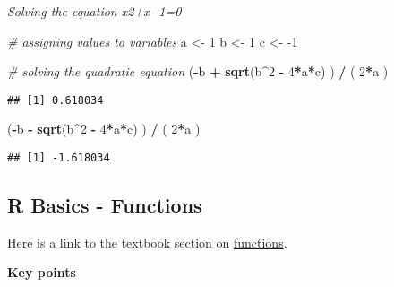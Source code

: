 \documentclass[]{article}
\newenvironment{Shaded}{\begin{snugshade}}{\end{snugshade}}
\newcommand{\CommentTok}[1]{\textcolor[rgb]{0.56,0.35,0.01}{\textit{#1}}}
\newcommand{\DecValTok}[1]{\textcolor[rgb]{0.00,0.00,0.81}{#1}}
\newcommand{\KeywordTok}[1]{\textcolor[rgb]{0.13,0.29,0.53}{\textbf{#1}}}
\newcommand{\NormalTok}[1]{#1}
\newcommand{\OperatorTok}[1]{\textcolor[rgb]{0.81,0.36,0.00}{\textbf{#1}}}
\newcommand{\StringTok}[1]{\textcolor[rgb]{0.31,0.60,0.02}{#1}}
\begin{document}
\emph{Solving the equation x2+x−1=0}

\begin{Shaded}
\begin{Highlighting}[]
\CommentTok{# assigning values to variables}
\NormalTok{a <-}\StringTok{ }\DecValTok{1}
\NormalTok{b <-}\StringTok{ }\DecValTok{1}
\NormalTok{c <-}\StringTok{ }\DecValTok{-1}

\CommentTok{# solving the quadratic equation}
\NormalTok{(}\OperatorTok{-}\NormalTok{b }\OperatorTok{+}\StringTok{ }\KeywordTok{sqrt}\NormalTok{(b}\OperatorTok{^}\DecValTok{2} \OperatorTok{-}\StringTok{ }\DecValTok{4}\OperatorTok{*}\NormalTok{a}\OperatorTok{*}\NormalTok{c) ) }\OperatorTok{/}\StringTok{ }\NormalTok{( }\DecValTok{2}\OperatorTok{*}\NormalTok{a )}
\end{Highlighting}
\end{Shaded}

\begin{verbatim}
## [1] 0.618034
\end{verbatim}

\begin{Shaded}
\begin{Highlighting}[]
\NormalTok{(}\OperatorTok{-}\NormalTok{b }\OperatorTok{-}\StringTok{ }\KeywordTok{sqrt}\NormalTok{(b}\OperatorTok{^}\DecValTok{2} \OperatorTok{-}\StringTok{ }\DecValTok{4}\OperatorTok{*}\NormalTok{a}\OperatorTok{*}\NormalTok{c) ) }\OperatorTok{/}\StringTok{ }\NormalTok{( }\DecValTok{2}\OperatorTok{*}\NormalTok{a )}
\end{Highlighting}
\end{Shaded}

\begin{verbatim}
## [1] -1.618034
\end{verbatim}

\hypertarget{r-basics---functions}{%
\subsection{R Basics - Functions}\label{r-basics---functions}}

Here is a link to the textbook section on
\href{https://rafalab.github.io/dsbook/r-basics.html\#functions}{functions}.

\textbf{Key points}
\end{document}
